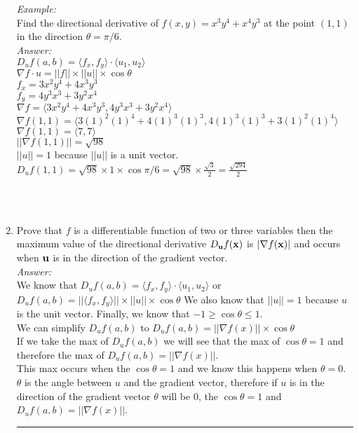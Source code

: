\documentclass[11pt]{article}
\newenvironment{proof}{{\bf Proof:  }}{\hfill\rule{2mm}{2mm}}
\begin{document}
\begin{enumerate}
    \\
    \\
    \textit{Example:}
    \\
    Find the directional derivative of $f(x,y) = x^3y^4+x^4y^3$ at the point $(1,1)$ in the direction $\theta =\pi/6$.
    \\
    \textit{Answer:}
    \\
    $D_uf(a,b)= \langle f_x, f_y \rangle \cdot \langle u_1,u_2 \rangle$
    \\
    $\nabla f \cdot u= ||f|| \times ||u|| \times \cos \theta$
    \\
    $f_x=3x^2y^4+4x^3y^3$
    \\
    $f_y=4y^3x^3+3y^2x^4$
    \\
    $\nabla f= \langle 3x^2y^4+4x^3y^3, 4y^3x^3+3y^2x^4 \rangle$
    \\
    $\nabla f(1,1)= \langle 3(1)^2(1)^4+4(1)^3(1)^3, 4(1)^3(1)^3+3(1)^2(1)^4 \rangle$
    \\
     $\nabla f(1,1)= \langle 7,7 \rangle$
     \\
     $||\nabla f(1,1)||=\sqrt{98}$
     \\
     $||u||=1$ because $||u||$ is a unit vector.
     \\
     $D_uf(1,1)= \sqrt{98} \times 1 \times \cos{\pi/6}= \sqrt{98} \times \frac{\sqrt{3}}{2}= \frac{\sqrt{294}}{2} $
     
     \\
     
     \\
     
     \begin{proof}
     
   \item Prove that $f$ is a differentiable function of two or three variables then the maximum value of the directional derivative $D_{\bf u}f({\bf x})$ is $| \nabla f({\bf x})|$ and occurs when ${\bf u}$ is in the direction of the gradient vector.
   \\
   \textit{Answer:}
   \\
   We know that $D_uf(a,b)= \langle f_x, f_y \rangle \cdot \langle u_1,u_2 \rangle$ or $D_uf(a,b)= ||\langle f_x, f_y \rangle|| \times ||u|| \times \cos \theta$ We also know that $||u||=1$ because $u$ is the unit vector. Finally, we know that $-1 \ge \cos \theta \le 1$.
   \\
   We can simplify $D_uf(a,b)$ to $D_uf(a,b)= ||\nabla f(x)|| \times \cos \theta$  
   \\
   If we take the max of $D_uf(a,b)$ we will see that the max of $\cos \theta =1$ and therefore the max of $D_uf(a,b)= ||\nabla f(x)||$. 
   \\
   This max occurs when the $\cos \theta =1$ and we know this happens when $\theta = 0$. $\theta$ is the angle between $u$ and the gradient vector, therefore if $u$ is in the direction of the gradient vector $\theta$ will be $0$, the $\cos \theta =1$ and $D_uf(a,b)= ||\nabla f(x)||$. 
     

\end{proof}
\end{enumerate}
\end{document}
